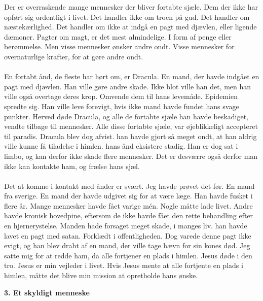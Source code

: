 \documentclass[]{article}
\begin{document}
Der er overraskende mange mennesker der bliver fortabte sjæle. Dem der ikke har opført sig ordentligt i livet. Det handler ikke om troen på gud. Det handler om næstekærlighed. Det handler om ikke at indgå en pagt med djævlen, eller ligende dæmoner. Pagter om magt, er det mest almindelige. I form af penge eller berømmelse. Men visse mennesker ønsker andre ondt. Visse mennesker for overnaturlige krafter, for at gøre andre ondt. 
\\ \\
En fortabt ånd, de fleste har hørt om, er Dracula. En mand, der havde indgået en pagt med djævlen. Han ville gøre andre skade. Ikke blot ville han det, men han ville også overtage deres krop. Omvende dem til hans levemåde. Epidemien spredte sig. Han ville leve forevigt, hvis ikke mand havde fundet hans svage punkter. Herved døde Dracula, og alle de fortabte sjæle han havde beskadiget, vendte tilbage til mennesker. Alle disse fortabte sjæle, var øjeblikkeligt accepteret til paradis. Dracula blev dog afvist. han havde gjort så meget ondt, at han aldrig ville kunne få tiladelse i himlen. hans ånd eksistere stadig. Han er dog sat i limbo, og kan derfor ikke skade flere mennesker. Det er desværre også derfor man ikke kan kontakte ham, og frælse hans sjæl.
\\ \\
Det at komme i kontakt med ånder er svært. Jeg havde prøvet det før. En mand fra sverige. En mand der havde udgivet sig for at være læge. Han havde fusket i flere år. Mange mennesker havde fået varige mén. Nogle måtte lade livet. Andre havde kronisk hovedpine, eftersom de ikke havde fået den rette behandling efter en hjernerystelse. Manden hade forsaget meget skade, i manges liv. han havde lavet en pagt med satan. Forklædt i offentligheden. Dog varede denne pagt ikke evigt, og han blev drabt af en mand, der ville tage hævn for sin kones død. Jeg satte mig for at redde ham, da alle fortjener en plads i himlen. Jesus døde i den tro. Jesus er min vejleder i livet. Hvis Jesus mente at alle fortjente en plads i himlen, måtte det blive min mission at opretholde hans ønske.

\begin{center}
	\large\textbf{3. Et skyldigt menneske}
\end{center}
\end{document}
